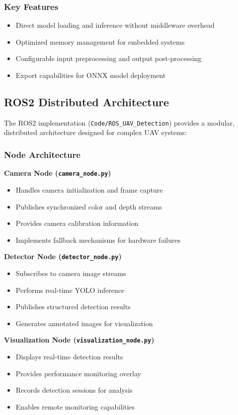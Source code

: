 \documentclass[12pt,a4paper]{article}
\begin{document}
\subsubsection{Key Features}
\begin{itemize}
    \item Direct model loading and inference without middleware overhead
    \item Optimized memory management for embedded systems
    \item Configurable input preprocessing and output post-processing
    \item Export capabilities for ONNX model deployment
\end{itemize}

\subsection{ROS2 Distributed Architecture}

The ROS2 implementation (\texttt{Code/ROS\_UAV\_Detection}) provides a modular, distributed architecture designed for complex UAV systems:

\subsubsection{Node Architecture}

\textbf{Camera Node (\texttt{camera\_node.py})}
\begin{itemize}
    \item Handles camera initialization and frame capture
    \item Publishes synchronized color and depth streams
    \item Provides camera calibration information
    \item Implements fallback mechanisms for hardware failures
\end{itemize}

\textbf{Detector Node (\texttt{detector\_node.py})}
\begin{itemize}
    \item Subscribes to camera image streams
    \item Performs real-time YOLO inference
    \item Publishes structured detection results
    \item Generates annotated images for visualization
\end{itemize}

\textbf{Visualization Node (\texttt{visualization\_node.py})}
\begin{itemize}
    \item Displays real-time detection results
    \item Provides performance monitoring overlay
    \item Records detection sessions for analysis
    \item Enables remote monitoring capabilities
\end{itemize}
\end{document}
